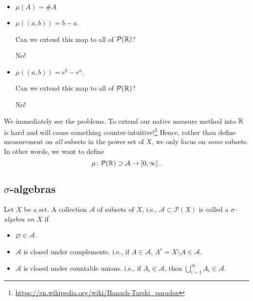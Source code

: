 \begin{eg}
\begin{enumerate}
		      \begin{itemize}
			      \item \(\mu(A) = \# A\)
			      \item \(\mu(\left(a, b\right)) = b-a\).
			            \begin{problem}
			            Can we extend this map to all of \(\mathcal{P}(\mathbb{\MakeUppercase{R}} )\)?
			            \begin{answer}
				            No!
			            \end{answer}
			            \end{problem}
			      \item \(\mu(\left(a, b\right)) = e^b - e^a\).
			            \begin{problem}
			            Can we extend this map to all of \(\mathcal{P}(\mathbb{\MakeUppercase{R}} )\)?
			            \begin{answer}
				            No!
			            \end{answer}
			            \end{problem}
		      \end{itemize}
	\end{enumerate}
\end{eg}

We immediately see the problems. To extend our native measure method into \(\mathbb{\MakeUppercase{R}} \) is hard and will cause something counter-intuitive!\footnote{\url{https://en.wikipedia.org/wiki/Banach-Tarski_paradox}}
Hence, rather than define measurement on \emph{all} subsets in the power set of \(X\), we only focus on \emph{some} subsets. In other words, we
want to define
\[
	\mu\colon \mathcal{P}(\mathbb{\MakeUppercase{R}} )\supset\mathcal{A} \to \left[0, \infty\right].
\]

\subsection{\(\sigma\)-algebras}
\begin{definition}
	Let \(X\) be a set. A collection \(\mathcal{A} \) of subsets of \(X\), i.e., \(\mathcal{A}\subset \mathcal{P} (X) \) is called a \emph{\(\sigma\)-algebra on \(X\)} if
	\begin{itemize}
		\item \(\varnothing \in \mathcal{A} \).
		\item \(\mathcal{A} \) is closed under complements. i.e., if \(A\in \mathcal{A} \), \(A^c = X\setminus A\in \mathcal{A} \).
		\item \(\mathcal{A} \) is closed under countable unions. i.e., if \(A_i\in \mathcal{A} \), then \(\bigcup\limits_{i=1}^{\infty} A_{i}\in \mathcal{A} \).
	\end{itemize}
\end{definition}

